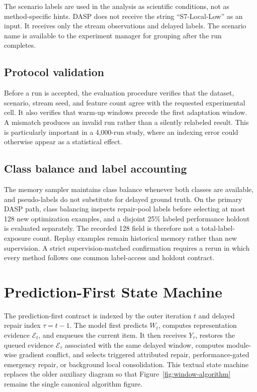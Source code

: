The scenario labels are used in the analysis as scientific conditions, not as method-specific hints. DASP does not receive the string ``S7-Local-Low'' as an input. It receives only the stream observations and delayed labels. The scenario name is available to the experiment manager for grouping after the run completes.

\subsection{Protocol validation}
Before a run is accepted, the evaluation procedure verifies that the dataset, scenario, stream seed, and feature count agree with the requested experimental cell. It also verifies that warm-up windows precede the first adaptation window. A mismatch produces an invalid run rather than a silently relabeled result. This is particularly important in a 4,000-run study, where an indexing error could otherwise appear as a statistical effect.

\subsection{Class balance and label accounting}
The memory sampler maintains class balance whenever both classes are available, and pseudo-labels do not substitute for delayed ground truth. On the primary DASP path, class balancing inspects repair-pool labels before selecting at most 128 new optimization examples, and a disjoint 25\% labeled performance holdout is evaluated separately. The recorded 128 field is therefore not a total-label-exposure count. Replay examples remain historical memory rather than new supervision. A strict supervision-matched confirmation requires a rerun in which every method follows one common label-access and holdout contract.

\section{Prediction-First State Machine}
\label{app:state-machine}

The prediction-first contract is indexed by the outer iteration $t$ and delayed repair index $\tau=t-1$. The model first predicts $W_t$, computes representation evidence $\mathcal E_t$, and enqueues the current item. It then receives $Y_{\tau}$, restores the queued evidence $\mathcal E_{\tau}$ associated with the same delayed window, computes module-wise gradient conflict, and selects triggered attributed repair, performance-gated emergency repair, or background local consolidation. This textual state machine replaces the older auxiliary diagram so that Figure~\ref{fig:window-algorithm} remains the single canonical algorithm figure.
